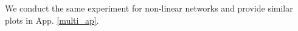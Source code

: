 \documentclass{article}
\theoremstyle{plain}
\theoremstyle{definition}
\theoremstyle{remark}
\begin{document}
\begin{itemize}



\end{itemize}
We conduct the same experiment for non-linear networks and provide similar plots in App. \ref{multi_ap}.
% 
\end{document}
